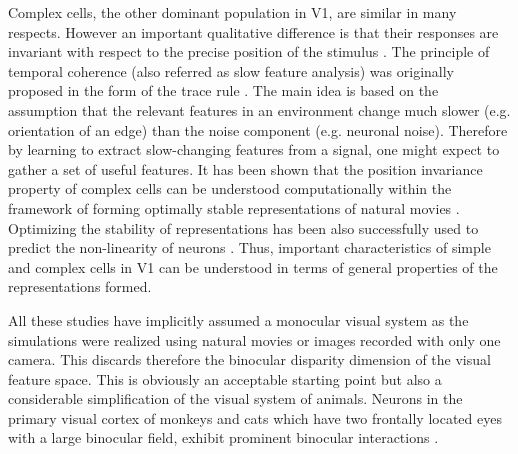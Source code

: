 Complex cells, the other dominant population in V1, are similar in many
respects. However an important qualitative difference is that their
responses are invariant with respect to the precise position of the
stimulus \citep{hubel1962b}. The principle of temporal coherence (also
referred as slow feature analysis) was originally proposed in the form of
the trace rule \citep{foldiak1991a}. The main idea is based on the
assumption that the relevant features in an environment change much slower
(e.g.  orientation of an edge) than the noise component (e.g. neuronal
noise). Therefore by learning to extract slow-changing features from a
signal, one might expect to gather a set of useful features. It has been
shown that the position invariance property of complex cells can be
understood computationally within the framework of forming optimally stable
representations of natural movies \citep{ hyvarinen2001a, einhauser2002a,
wiskott2002a, kording2004a}. Optimizing the stability of representations
has been also successfully used to predict the non-linearity of neurons
\citep{kayser2003c}. Thus, important characteristics of simple and complex
cells in V1 can be understood in terms of general properties of the
representations formed. 


All these studies have implicitly assumed a monocular visual system as the
simulations were realized using natural movies or images recorded with only
one camera. This discards therefore the binocular disparity dimension of
the visual feature space. This is obviously an acceptable starting point
but also a considerable simplification of the visual system of animals.
Neurons in the primary visual cortex of monkeys and cats which have two
frontally located eyes with a large binocular field, exhibit prominent
binocular interactions \citep{pettigrew1968a, poggio1977a, anzai1999a,
anzai1999b, deangelis2000a}. 

